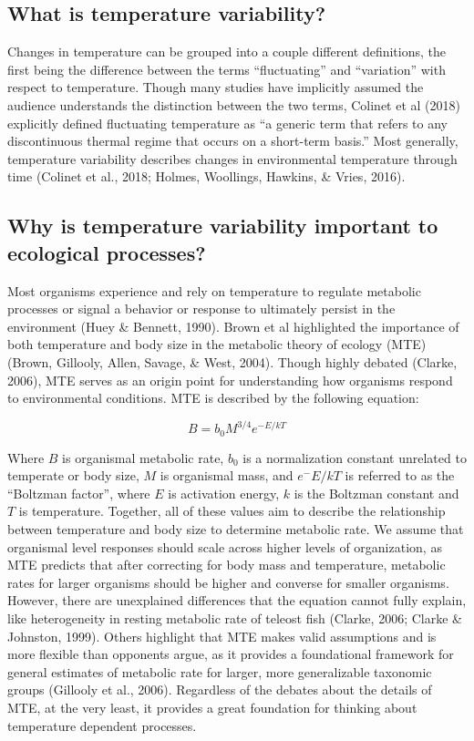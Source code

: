 \documentclass[12pt,twoside]{reedthesis}
\begin{document}
\hypertarget{what-is-temperature-variability}{%
\subsection{What is temperature variability?}\label{what-is-temperature-variability}}

Changes in temperature can be grouped into a couple different definitions, the first being the difference between the terms ``fluctuating'' and ``variation'' with respect to temperature. Though many studies have implicitly assumed the audience understands the distinction between the two terms, Colinet et al (2018) explicitly defined fluctuating temperature as ``a generic term that refers to any discontinuous thermal regime that occurs on a short-term basis.'' Most generally, temperature variability describes changes in environmental temperature through time (Colinet et al., 2018; Holmes, Woollings, Hawkins, \& Vries, 2016).

\hypertarget{why-is-temperature-variability-important-to-ecological-processes}{%
\subsection{Why is temperature variability important to ecological processes?}\label{why-is-temperature-variability-important-to-ecological-processes}}

Most organisms experience and rely on temperature to regulate metabolic processes or signal a behavior or response to ultimately persist in the environment (Huey \& Bennett, 1990). Brown et al highlighted the importance of both temperature and body size in the metabolic theory of ecology (MTE) (Brown, Gillooly, Allen, Savage, \& West, 2004). Though highly debated (Clarke, 2006), MTE serves as an origin point for understanding how organisms respond to environmental conditions. MTE is described by the following equation:

\[
B = b_0M^{3/4}e^{-E/kT}
\]

Where \(B\) is organismal metabolic rate, \(b_0\) is a normalization constant unrelated to temperate or body size, \(M\) is organismal mass, and \(e^-E/kT\) is referred to as the ``Boltzman factor'', where \(E\) is activation energy, \(k\) is the Boltzman constant and \(T\) is temperature. Together, all of these values aim to describe the relationship between temperature and body size to determine metabolic rate. We assume that organismal level responses should scale across higher levels of organization, as MTE predicts that after correcting for body mass and temperature, metabolic rates for larger organisms should be higher and converse for smaller organisms. However, there are unexplained differences that the equation cannot fully explain, like heterogeneity in resting metabolic rate of teleost fish (Clarke, 2006; Clarke \& Johnston, 1999). Others highlight that MTE makes valid assumptions and is more flexible than opponents argue, as it provides a foundational framework for general estimates of metabolic rate for larger, more generalizable taxonomic groups (Gillooly et al., 2006). Regardless of the debates about the details of MTE, at the very least, it provides a great foundation for thinking about temperature dependent processes.
\end{document}
